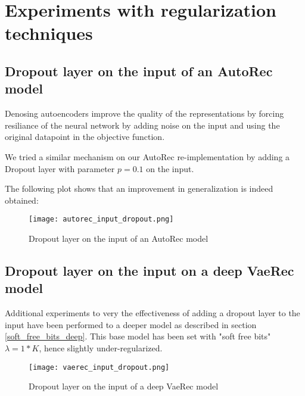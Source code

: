 \section{Experiments with regularization techniques}

\subsection{Dropout layer on the input of an AutoRec model}

Denosing autoencoders\cite{denoising} improve the quality of the representations
by forcing resiliance of the neural network by adding noise on the input
and using the original datapoint in the objective function.

We tried a similar mechanism on our AutoRec re-implementation
by adding a Dropout \cite{Srivastava2014} layer with parameter $p=0.1$ on the input. 

The following plot shows that an improvement in generalization is indeed obtained:


\begin{figure}[H]
\centering
\texttt{[image: autorec\_input\_dropout.png]}
\caption{Dropout layer on the input of an AutoRec model}
\label{input_dropout_fig}
\end{figure}

\subsection{Dropout layer on the input on a deep VaeRec model}
Additional experiments to very the effectiveness of 
adding a dropout layer to the input have been performed
to a deeper model as described in section \ref{soft_free_bits_deep}.
This base model has been set with "soft free bits" $\lambda=1*K$,
hence slightly under-regularized.

\begin{figure}[H]
\centering
\texttt{[image: vaerec\_input\_dropout.png]}
\caption{Dropout layer on the input of a deep VaeRec model}
\label{vaerec_input_dropout_fig}
\end{figure}

